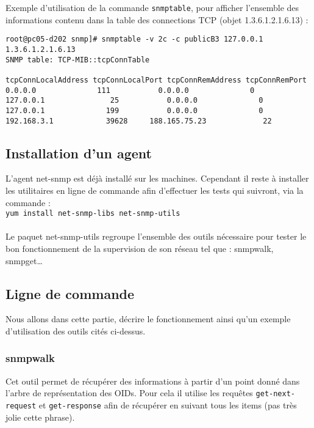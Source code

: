 \documentclass[12pt,a4paper,notitlepage]{article}
\begin{document}
Exemple d'utilisation de la commande \texttt{snmptable}, pour afficher l'ensemble des informations contenu dans la table des connections TCP (objet 1.3.6.1.2.1.6.13) :

\begin{lstlisting}[title=snmptable]
root@pc05-d202 snmp]# snmptable -v 2c -c publicB3 127.0.0.1 1.3.6.1.2.1.6.13
SNMP table: TCP-MIB::tcpConnTable

tcpConnLocalAddress tcpConnLocalPort tcpConnRemAddress tcpConnRemPort
0.0.0.0              111           0.0.0.0              0
127.0.0.1               25           0.0.0.0              0
127.0.0.1              199           0.0.0.0              0
192.168.3.1            39628     188.165.75.23             22
\end{lstlisting}


\subsection{Installation d'un agent}
L'agent net-snmp est déjà installé sur les machines. Cependant il reste à installer les utilitaires en ligne de commande afin d'effectuer les tests qui suivront, via la commande :\\


\noindent \texttt{yum install net-snmp-libs net-snmp-utils}

\paragraph{}Le paquet net-snmp-utils regroupe l'ensemble des outils nécessaire pour tester le bon fonctionnement de la supervision de son réseau tel que : snmpwalk, snmpget\ldots 

\subsection{Ligne de commande}
Nous allons dans cette partie, décrire le fonctionnement ainsi qu'un exemple d'utilisation des outils cités ci-dessus.


\subsubsection{snmpwalk}
Cet outil permet de récupérer des informations à partir d'un point donné dans l'arbre de représentation des OIDs. Pour cela il utilise les requêtes \texttt{get-next-request} et \texttt{get-response} afin de récupérer en suivant tous les items (pas très jolie cette phrase).
\end{document}
